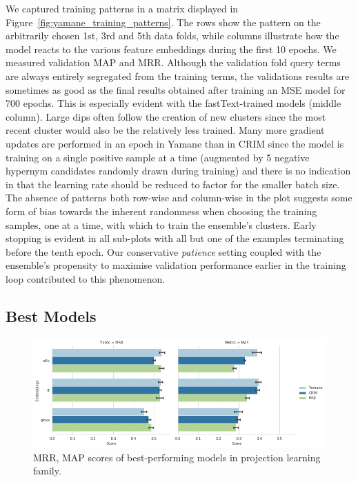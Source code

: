 We captured training patterns in a matrix displayed in Figure~\ref{fig:yamane_training_patterns}. The rows show the pattern on the arbitrarily chosen 1st, 3rd and 5th data folds, while columns illustrate how the model reacts to the various feature embeddings during the first 10 epochs.  We measured validation \ac{MAP} and \ac{MRR}.  Although the validation fold query terms are always entirely segregated from the training terms, the validations results are sometimes as good as the final results obtained after training an \ac{MSE} model for 700 epochs.  This is especially evident with the  fastText-trained models (middle column).  Large dips often follow the creation of new clusters since the most recent cluster would also be the relatively less trained.  Many more gradient updates are performed in an epoch in Yamane than in CRIM since the model is training on a single positive sample at a time (augmented by 5 negative hypernym candidates randomly drawn during training) and there is no indication in \citet{yamane2016distributional} that the learning rate should be reduced to factor for the smaller batch size.  The absence of patterns both row-wise and column-wise in the plot suggests some form of bias towards the inherent randomness when choosing the training samples, one at a time, with which to train the ensemble's clusters.  Early stopping is evident in all sub-plots with all but one of the examples terminating before the tenth epoch.  Our conservative \textit{patience} setting coupled with the ensemble's propensity to maximise validation performance earlier in the training loop contributed to this phenomenon.

\subsection{Best Models}
\begin{figure}[ht!] 
  \centering
  \includegraphics[width=1.\linewidth]{images/Comparison_of_best_performing_algorithms.png}
  \caption{MRR, MAP scores of best-performing models in projection learning family.}
  \label{fig:part1_best_models}
\end{figure}

